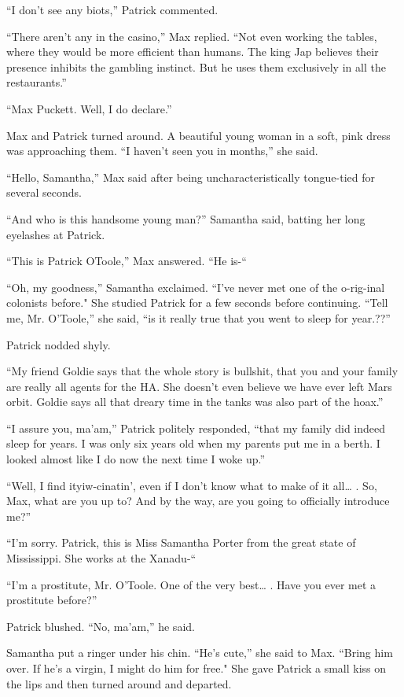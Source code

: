 \documentclass[]{article}
\begin{document}
{“I don’t see any biots,” Patrick commented.

“There aren’t any in the casino,” Max replied.  “Not even working the tables, where they would be more efficient than humans.  The king Jap believes their presence inhibits the gambling instinct.  But he uses them exclusively in all the restaurants.”

“Max Puckett.  Well, I do declare.”

Max and Patrick turned around.  A beautiful young woman in a soft, pink dress was approaching them.  “I haven’t seen you in months,” she said.

“Hello, Samantha,” Max said after being uncharacteristically tongue-tied for several seconds.

“And who is this handsome young man?” Samantha said, batting her long eyelashes at Patrick.

“This is Patrick OToole,” Max answered.  “He is-“

“Oh, my goodness,” Samantha exclaimed.  “I’ve never met one of the o-rig-inal colonists before."  She studied Patrick for a few seconds before continuing.  “Tell me, Mr.  O’Toole,” she said, “is it really true that you went to sleep for year.??”

Patrick nodded shyly.

“My friend Goldie says that the whole story is bullshit, that you and your family are really all agents for the HA.  She doesn’t even believe we have ever left Mars orbit.  Goldie says all that dreary time in the tanks was also part of the hoax.”

“I assure you, ma’am,” Patrick politely responded, “that my family did indeed sleep for years.  I was only six years old when my parents put me in a berth.  I looked almost like I do now the next time I woke up.”

“Well, I find ityiw-cinatin’, even if I don’t know what to make of it all… .  So, Max, what are you up to? And by the way, are you going to officially introduce me?”

“I’m sorry.  Patrick, this is Miss Samantha Porter from the great state of Mississippi.  She works at the Xanadu-“

“I’m a prostitute, Mr.  O’Toole.  One of the very best… .  Have you ever met a prostitute before?”

Patrick blushed.  “No, ma’am,” he said.

Samantha put a ringer under his chin.  “He’s cute,” she said to Max.  “Bring him over.  If he’s a virgin, I might do him for free."  She gave Patrick a small kiss on the lips and then turned around and departed.

}
\end{document}
